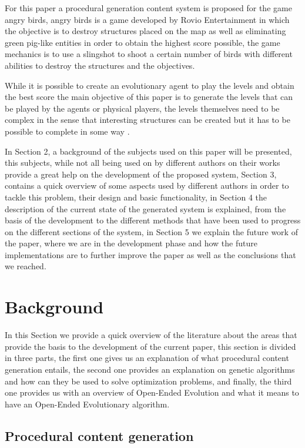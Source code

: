 \documentclass[graybox]{svmult}
\begin{document}
For this paper a procedural generation content system is proposed for the game angry birds, angry birds is a game developed by Rovio Entertainment in which the objective is to destroy structures placed on the map as well as eliminating green pig-like entities in order to obtain the highest score possible, the game mechanics is to use a slingshot to shoot a certain number of birds with different abilities to destroy the structures and the objectives. \cite{RovioEntertainmentCorporation2009}

 
While it is possible to create an evolutionary agent to play the levels and obtain the best score the main objective of this paper is to generate the levels that can be played by the agents or physical players, the levels themselves need to be complex in the sense that interesting structures can be created but it has to be possible to complete in some way \cite{Stephenson2018,Stephenson}.
 
In Section 2, a background of the subjects used on this paper will be presented, this subjects, while not all being used on by different authors on their works provide a great help on the development of the proposed system, Section 3, contains a quick overview of some aspects used by different authors in order to tackle this problem, their design and basic functionality, in Section 4 the description of the current state of the generated system is explained, from the basis of the development to the different methods that have been used to progress on the different sections of the system, in Section 5 we explain the future work of the paper, where we are in the development phase and how the future implementations are to further improve the paper as well as the conclusions that we reached.
 
\section{Background}
\label{sec:3}
In this Section we provide a quick overview of the literature about the areas that provide the basis to the development of the current paper, this section is divided in three parts, the first one gives us an explanation of what procedural content generation entails, the second one provides an explanation on genetic algorithms and how can they be used to solve optimization problems, and finally, the third one provides us with an overview of Open-Ended Evolution and what it means to have an Open-Ended Evolutionary algorithm.

\subsection{Procedural content generation}
\end{document}
